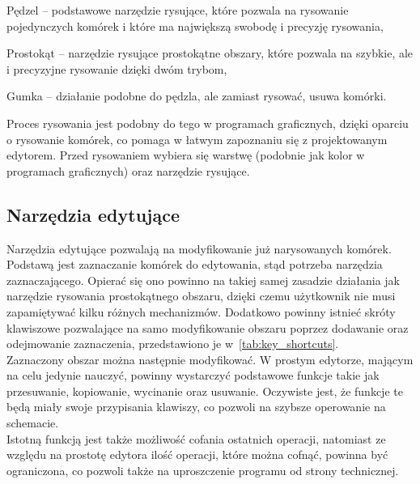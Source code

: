 \begin{citemize}
    \item Pędzel -- podstawowe narzędzie rysujące, które pozwala na rysowanie pojedynczych komórek
    i które ma największą swobodę i precyzję rysowania,
    \item Prostokąt -- narzędzie rysujące prostokątne obszary, które pozwala na szybkie,
    ale i precyzyjne rysowanie dzięki dwóm trybom,
    \item Gumka -- działanie podobne do pędzla, ale zamiast rysować, usuwa komórki.
\end{citemize}

\indent Proces rysowania jest podobny do tego w programach graficznych,
dzięki oparciu o rysowanie komórek, co pomaga w łatwym zapoznaniu się z projektowanym edytorem.
Przed rysowaniem wybiera się warstwę (podobnie jak kolor w programach graficznych) oraz narzędzie rysujące.

\subsection{Narzędzia edytujące}
\label{subsec:narzedzia_edytujace}

Narzędzia edytujące pozwalają na modyfikowanie już narysowanych komórek.
Podstawą jest zaznaczanie komórek do edytowania,
stąd potrzeba narzędzia zaznaczającego.
Opierać się ono powinno na takiej samej zasadzie działania jak narzędzie rysowania prostokątnego obszaru,
dzięki czemu użytkownik nie musi zapamiętywać kilku różnych mechanizmów.
Dodatkowo powinny istnieć skróty klawiszowe pozwalające na samo modyfikowanie obszaru poprzez dodawanie
oraz odejmowanie zaznaczenia, przedstawiono je w~\ref{tab:key_shortcuts}. \\
\indent Zaznaczony obszar można następnie modyfikować.
W prostym edytorze, mającym na celu jedynie nauczyć,
powinny wystarczyć podstawowe funkcje takie jak przesuwanie, kopiowanie, wycinanie oraz usuwanie.
Oczywiste jest, że funkcje te będą miały swoje przypisania klawiszy, co pozwoli na szybsze operowanie na schemacie. \\
\indent Istotną funkcją jest także możliwość cofania ostatnich operacji,
natomiast ze względu na prostotę edytora ilość operacji, które można cofnąć, powinna być ograniczona,
co pozwoli także na uproszczenie programu od strony technicznej. %

